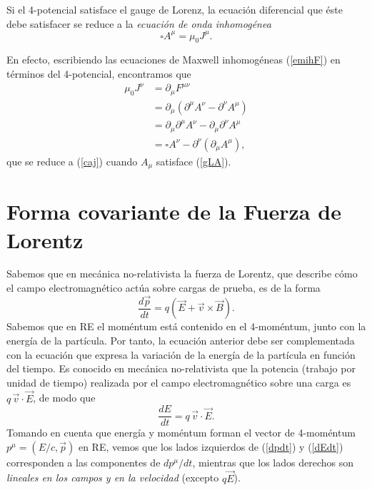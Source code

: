 Si el 4-potencial satisface el gauge de Lorenz, la ecuación diferencial que éste debe satisfacer se reduce a la \textit{ecuación de onda inhomogénea}
\begin{equation}
\boxed{\square A^\mu=\mu_0 J^\mu .} \label{caj}
\end{equation}

En efecto, escribiendo las ecuaciones de Maxwell inhomogéneas (\ref{emihF}) en términos del 4-potencial, encontramos que
\begin{align}
\mu_0 J^\nu &=\partial_\mu F^{\mu\nu}  \\
&=\partial_\mu \left(  \partial^\mu A^\nu -\partial^\nu A^\mu \right)  \\
&= \partial_\mu \partial^\mu A^\nu -\partial_\mu \partial^\nu A^\mu   \\
&= \square A^\nu -\partial^\nu (\partial_\mu A^\mu)   ,
\end{align}
que se reduce a (\ref{caj}) cuando $A_\mu$ satisface (\ref{gLA}).

\section{Forma covariante de la Fuerza de Lorentz}
Sabemos que en mecánica no-relativista la fuerza de Lorentz, que describe cómo el campo electromagnético actúa sobre cargas de prueba, es de la forma
\begin{equation}
\frac{d\vec{p}}{dt}=q\left(  \vec{E}+\vec{v}\times\vec{B}\right).
\label{dpdt}
\end{equation}
Sabemos que en RE el moméntum está contenido en el 4-moméntum, junto con la
energía de la partícula. Por tanto, la ecuación anterior debe ser
complementada con la ecuación que expresa la variación de la energía de la
partícula en función del tiempo. Es conocido en mecánica no-relativista que
la potencia (trabajo por unidad de tiempo) realizada por el campo
electromagnético sobre una carga es $q\,\vec{v}\cdot\vec{E}$, de modo que
\begin{equation}
\frac{dE}{dt}=q\,\vec{v}\cdot\vec{E}. \label{dEdt}
\end{equation}
Tomando en cuenta que energía y moméntum forman el vector de 4-moméntum $p^\mu=({E}/{c},\vec{p})$ en RE, vemos que los lados
izquierdos de (\ref{dpdt}) y (\ref{dEdt}) corresponden a las componentes de
${dp^\mu}/{dt}$, mientras que los lados derechos son \textit{lineales en los campos y en la velocidad} (excepto $q\vec{E}$).

